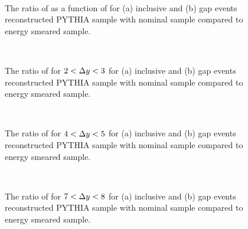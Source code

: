 \begin{figure}
\centering
\mbox{
              \quad
              \quad
                              }
\caption[Uncertainty bands due to the JER uncertainty for \mean{\costwodphi{}}]{
The ratio of \mean{\costwodphi{}} as a function of \dy{} for (a) inclusive and (b) gap events reconstructed PYTHIA sample with nominal sample compared to energy smeared sample.
\label{GBJ2:ResoEnergy:cos2}}
\end{figure}


\begin{figure}
\centering
\mbox{
              \quad
              \quad
                              }
\caption[Uncertainty bands due to the JER uncertainty for \dphiDist{} for $2<\dy{}<3$]{
The ratio of \dphiDist{} for $2<\dy{}<3$ for (a) inclusive and (b) gap events reconstructed PYTHIA sample with nominal sample compared to energy smeared sample.
\label{GBJ2:ResoEnergy:dphi23}}
\end{figure}


\begin{figure}
\centering
\mbox{
              \quad
              \quad
                              }
\caption[Uncertainty bands due to the JER uncertainty for \dphiDist{} for $4<\dy{}<5$]{
The ratio of \dphiDist{} for $4<\dy{}<5$ for (a) inclusive and (b) gap events reconstructed PYTHIA sample with nominal sample compared to energy smeared sample.
\label{GBJ2:ResoEnergy:dphi45}}
\end{figure}



\begin{figure}
\centering
\mbox{
              \quad
              \quad
                              }
\caption[Uncertainty bands due to the JER uncertainty for \dphiDist{} for $7<\dy{}<8$]{
The ratio of \dphiDist{} for $7<\dy{}<8$ for (a) inclusive and (b) gap events reconstructed PYTHIA sample with nominal sample compared to energy smeared sample.
\label{GBJ2:ResoEnergy:dphi78}}
\end{figure}



